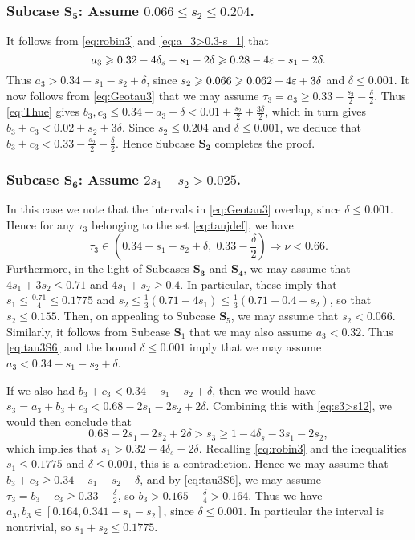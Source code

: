 \subsubsection*{Subcase $\mathbf{S_5}$: Assume $0.066\leq s_2\leq
0.204$.}

It follows from
\eqref{eq:robin3} and
 \eqref{eq:a_3>0.3-s_1} that
$$
a_3 \geqslant  0.32-4\delta_s-s_1 -2\delta \geqslant 0.28-4\varepsilon-s_1 -2\delta.
$$
Thus
$a_3>0.34-s_1-s_2 +\delta$, since $s_2\geqslant 0.066 \geqslant 0.062+4\varepsilon +3\delta$ and $\delta\leq 0.001$.
It now follows from  \eqref{eq:Geotau3} that we may assume $\tau_3=a_3 \geq  0.33
-\frac{s_2}{2}-
\frac{\delta}{2}$.
Thus
\eqref{eq:Thue} gives
$b_3,c_3 \le 0.34-a_3 +\delta< 0.01 +\frac{s_2}{2}+ \frac{3\delta}{2}$, which in turn gives
$b_3+c_3 < 0.02+s_2  +3\delta$.
Since $s_2\leq 0.204$ and $\delta\leq 0.001$, we deduce that
$b_3+c_3<0.33-\frac{s_2}{2}-\frac{\delta}{2}$. Hence
Subcase $\mathbf{S_2}$ completes the proof.


\subsubsection*{Subcase $\mathbf{S_6}$: Assume $2s_1-s_2>0.025$.}

In this case we note that the intervals in
\eqref{eq:Geotau3}  overlap, since $\delta\leq 0.001$.
Hence for any $\tau_3$ belonging to the set \eqref{eq:taujdef}, we have
\begin{equation}\label{eq:tau3S6}
\tau_3\in
 \left(0.34-s_1-s_2+ \delta, \;
 0.33-\frac{\delta}{2}\right)
 \Longrightarrow
\nu < 0.66.
\end{equation}
Furthermore,
in the light of Subcases $\mathbf{S_3}$ and $\mathbf{S_4}$, we may assume that
 $4s_1+3s_2\leq 0.71$ and $4s_1+s_2\geq 0.4$. In particular, these imply
 that $s_1\leq  \frac{0.71}{4}\leq 0.1775$ and
  $s_2 \leq  \frac{1}{3}(0.71 - 4s_1) \leq  \frac{1}{3}(0.71-0.4+s_2)$,  so that $s_2\leq 0.155$. Then, on appealing to Subcase
 $\mathbf{S}_5$, we  may assume that $s_2< 0.066$. Similarly, it follows from Subcase $\mathbf{S}_1$ that we may also assume $a_3<0.32$. Thus  \eqref{eq:tau3S6} and the bound $\delta\leq 0.001$ imply that we may assume $a_3< 0.34-s_1-s_2+ \delta$.

If we also had  $b_3+c_3<0.34-s_1-s_2+\delta$,  then we would have $s_3 = a_3 + b_3 +c_3 < 0.68-2s_1-2s_2+2\delta$. Combining this with
 \eqref{eq:s3>s12}, we would then conclude that
$$
0.68-2s_1-2s_2+2\delta>
s_3 \ge 1-4\delta_s-3s_1-2s_2,
$$
which implies that
$s_1>0.32-4\delta_s-2\delta$.
Recalling  \eqref{eq:robin3} and the inequalities
$s_1\leq 0.1775
 $ and $\delta\leq 0.001$, this is  a contradiction.
   Hence we may assume that  $b_3+c_3\ge 0.34-s_1-s_2+ \delta$, and by \eqref{eq:tau3S6}, we may assume $\tau_3=b_3+c_3\geq  0.33-\frac{\delta}{2}$, so $b_3>0.165-\frac{\delta}{4}> 0.164$. Thus we have $a_3,b_3\in [0.164, 0.341-s_1-s_2]$,
   since $\delta\leq 0.001$.
    In particular the interval is nontrivial, so $s_1+s_2\le 0.1775$.


